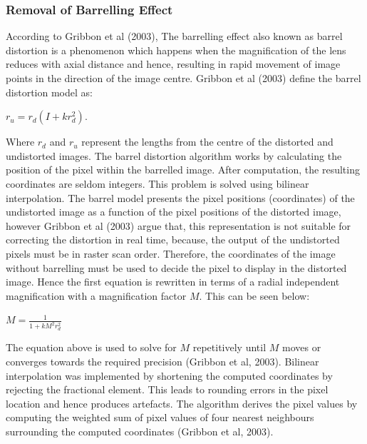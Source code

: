 \documentclass[a4paper, 12pt]{article}
\begin{document}
\subsubsection{ Removal of Barrelling Effect}

According to Gribbon et al (2003), The barrelling effect also known as barrel distortion is a phenomenon which happens when the magnification of the lens reduces with axial distance and hence, resulting in rapid movement of image points in the direction of the image centre. Gribbon et al (2003) define the barrel distortion model as: 
\begin{center}
 $r_{u} = r_{d}(I+kr^{2}_{d})$.
\end{center}

Where $r_{d}$ and $r_{u}$  represent the lengths from the centre of the distorted and undistorted images. The barrel distortion algorithm works by calculating the position of the pixel within the barrelled image. After computation, the resulting coordinates are seldom integers. This problem is solved using bilinear interpolation. The barrel model presents the pixel positions (coordinates) of the undistorted image as a function of the pixel positions of the distorted image, however Gribbon et al (2003) argue that, this representation is not suitable for correcting the distortion in real time, because, the output of the undistorted pixels must be in raster scan order. Therefore, the coordinates of the image without barrelling must be used to decide the pixel to display in the distorted image. Hence the first equation is rewritten in terms of a radial independent magnification with a magnification factor $M$. This can be seen below: 

\begin{center}
$M = \frac{1}{1+kM^2r^{2}_{d}}$
\end{center}

The equation above is used to solve for $M$ repetitively until $M$ moves or converges towards the required precision (Gribbon et al, 2003). Bilinear interpolation was implemented by shortening the computed coordinates by rejecting the fractional element. This leads to rounding errors in the pixel location and hence produces artefacts. The algorithm derives the pixel values by computing the weighted sum of pixel values of four nearest neighbours surrounding the computed coordinates (Gribbon et al, 2003). 
\end{document}
